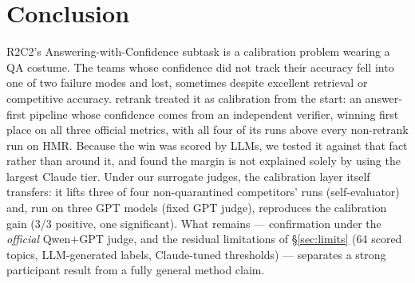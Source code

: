 \documentclass[sigconf,nonacm]{acmart}
\newcommand{\HMR}{\textsc{HMR}}
\begin{document}
\section{Conclusion}
R2C2's Answering-with-Confidence subtask is a calibration problem wearing a QA costume. The
teams whose confidence did not track their accuracy
fell into one of two failure modes and lost, sometimes despite excellent retrieval or
competitive accuracy. retrank treated it as calibration from the start: an answer-first
pipeline whose confidence comes from an independent verifier, winning first place on all
three official metrics, with all four of its runs above every non-retrank run on \HMR.
Because the win was scored by LLMs, we tested it against that fact rather than around it, and
found the margin is not explained solely by using the largest Claude tier. Under our
surrogate judges, the calibration layer itself transfers: it lifts three of four
non-quarantined competitors' runs (self-evaluator) and, run on three GPT models (fixed GPT
judge), reproduces the calibration gain (3/3 positive, one significant). What remains --- confirmation under the
\emph{official} Qwen$+$GPT judge, and the residual limitations of \S\ref{sec:limits} (64
scored topics, LLM-generated labels, Claude-tuned thresholds) --- separates a strong
participant result from a fully general method claim.
\end{document}
